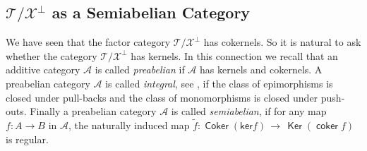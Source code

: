 \documentclass[oneside, a4paper,reqno]{amsart}
\numberwithin{equation}{section}
\theoremstyle{definition}
\begin{document}
 
 \subsection{${\mathcal T}/{\mathcal X}^{\bot}$ as a Semiabelian Category} We have seen that the factor category ${\mathcal T}/{\mathcal X}^{\bot}$ has cokernels. So it is natural to ask whether the category ${\mathcal T}/{\mathcal X}^{\bot}$ has kernels.  In this connection we recall that  an additive category ${\mathscr A}$ is called {\em preabelian} if ${\mathscr A}$ has kernels and cokernels.  A preabelian category ${\mathscr A}$ is called  {\em integral}, see \cite{Rump}, 
if the class of epimorphisms is closed under pull-backs and the class of monomorphisms is closed under push-outs. Finally a preabelian category ${\mathscr A}$ is called {\em semiabelian},  if for any map $f \colon A {\longrightarrow} B$ in ${\mathscr A}$, the naturally induced map $\widetilde{f} \colon \operatorname*{\mathsf{Coker}}(\mathsf{ker} f) \, {\longrightarrow} \, \operatorname*{\mathsf{Ker}}(\operatorname*{\mathsf{coker}} f)$ is regular.   

 
 
\end{document}
